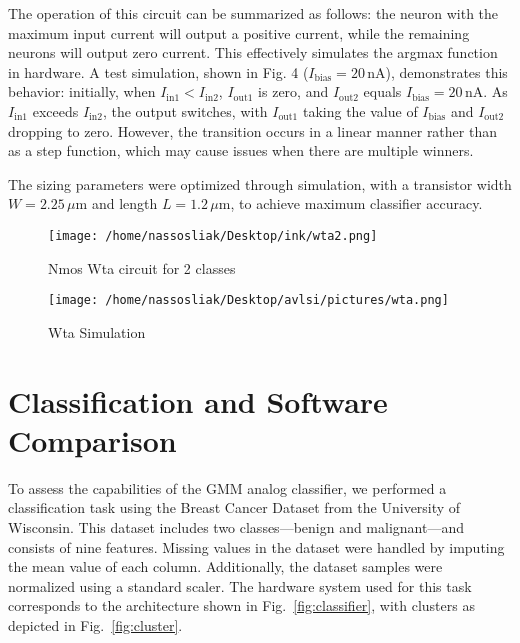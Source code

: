 \documentclass[conference]{IEEEtran}
\begin{document}
The operation of this circuit can be summarized as follows: the neuron with the maximum input current will output a positive current, while the remaining neurons will output zero current. This effectively simulates the argmax function in hardware. A test simulation, shown in Fig. 4 (\( I_{\text{bias}} = 20 \, \text{nA} \)), demonstrates this behavior: initially, when \( I_{\text{in1}} < I_{\text{in2}} \), \( I_{\text{out1}} \) is zero, and \( I_{\text{out2}} \) equals \( I_{\text{bias}} = 20 \, \text{nA} \). As \( I_{\text{in1}} \) exceeds \( I_{\text{in2}} \), the output switches, with \( I_{\text{out1}} \) taking the value of \( I_{\text{bias}} \) and \( I_{\text{out2}} \) dropping to zero. However, the transition occurs in a linear manner rather than as a step function, which may cause issues when there are multiple winners.

The sizing parameters were optimized through simulation, with a transistor width \( W = 2.25 \, \mu\text{m} \) and length \( L = 1.2 \, \mu\text{m} \), to achieve maximum classifier accuracy.

\begin{figure}[!h]
    \centering
    \texttt{[image: /home/nassosliak/Desktop/ink/wta2.png]}
    \caption{Nmos Wta circuit for 2 classes}
    \label{fig:wta2}
\end{figure}

\begin{figure}[!h]
    \centering
    \texttt{[image: /home/nassosliak/Desktop/avlsi/pictures/wta.png]}
    \caption{Wta Simulation}
    \label{fig:wta3}
\end{figure}



\section{\textbf{Classification and Software Comparison}}
To assess the capabilities of the GMM analog classifier, we performed a classification task using the Breast Cancer Dataset from the University of Wisconsin. This dataset includes two classes—benign and malignant—and consists of nine features. Missing values in the dataset were handled by imputing the mean value of each column. Additionally, the dataset samples were normalized using a standard scaler. The hardware system used for this task corresponds to the architecture shown in Fig.~\ref{fig:classifier}, with clusters as depicted in Fig.~\ref{fig:cluster}.
\end{document}
